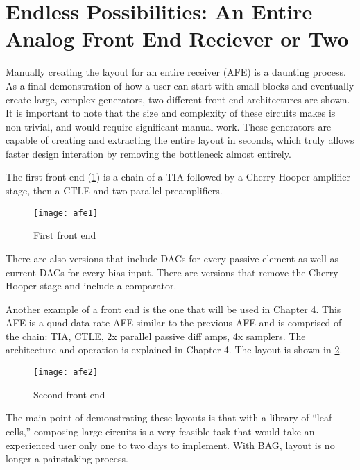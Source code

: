 \section{Endless Possibilities: An Entire Analog Front End Reciever or Two}
Manually creating the layout for an entire receiver (AFE) is a daunting process. As a final demonstration of how a user can start with small blocks and eventually create large, complex generators, two different front end architectures are shown. It is important to note that the size and complexity of these circuits makes is non-trivial, and would require significant manual work. These generators are capable of creating and extracting the entire layout in seconds, which truly allows faster design interation by removing the bottleneck almost entirely. 

The first front end (\ref{fig:afe1}) is a chain of a TIA followed by a Cherry-Hooper amplifier stage, then a CTLE and two parallel preamplifiers. 
\begin{figure}[h]
\centering
\texttt{[image: afe1]}
\caption{First front end}
\label{fig:afe1}
\end{figure}
There are also versions that include DACs for every passive element as well as current DACs for every bias input. There are versions that remove the Cherry-Hooper stage and include a comparator. 

Another example of a front end is the one that will be used in Chapter 4. This AFE is a quad data rate AFE similar to the previous AFE and is comprised of the chain: TIA, CTLE, 2x parallel passive diff amps, 4x samplers. The architecture and operation is explained in Chapter 4. The layout is shown in \ref{fig:afe2}.
\begin{figure}[h]
\centering
\texttt{[image: afe2]}
\caption{Second front end}
\label{fig:afe2}
\end{figure}
The main point of demonstrating these layouts is that with a library of ``leaf cells,'' composing large circuits is a very feasible task that would take an experienced user only one to two days to implement. With BAG, layout is no longer a painstaking process.

